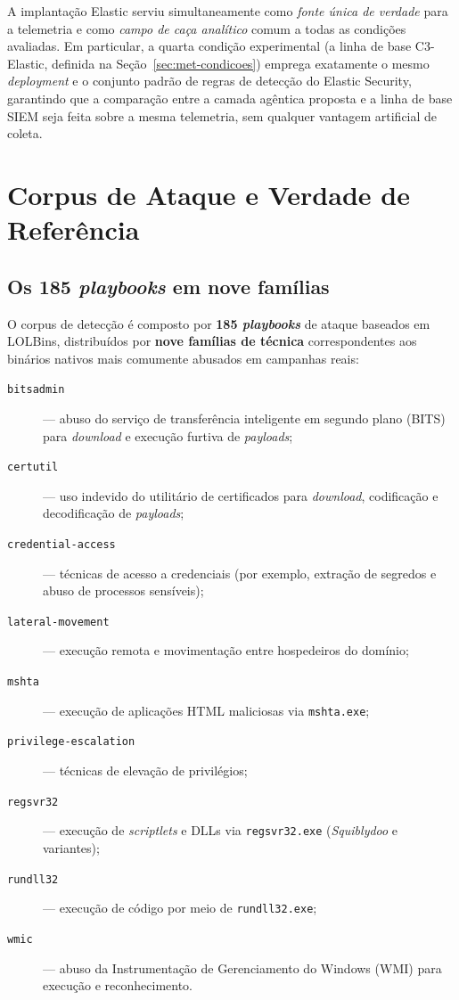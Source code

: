 A implantação Elastic serviu simultaneamente como \emph{fonte única de verdade}
para a telemetria e como \emph{campo de caça analítico} comum a todas as
condições avaliadas. Em particular, a quarta condição experimental (a linha de
base C3-Elastic, definida na Seção~\ref{sec:met-condicoes}) emprega exatamente o
mesmo \textit{deployment} e o conjunto padrão de regras de detecção do Elastic
Security, garantindo que a comparação entre a camada agêntica proposta e a linha
de base SIEM seja feita sobre a mesma telemetria, sem qualquer vantagem
artificial de coleta.

\section{Corpus de Ataque e Verdade de Referência}
\label{sec:met-corpus}

\subsection{Os 185 \textit{playbooks} em nove famílias}

O corpus de detecção é composto por \textbf{185 \textit{playbooks}} de ataque
baseados em LOLBins, distribuídos por \textbf{nove famílias de técnica}
correspondentes aos binários nativos mais comumente abusados em campanhas reais:

\begin{description}
    \item[\texttt{bitsadmin}] --- abuso do serviço de transferência inteligente
    em segundo plano (BITS) para \textit{download} e execução furtiva de
    \textit{payloads};
    \item[\texttt{certutil}] --- uso indevido do utilitário de certificados para
    \textit{download}, codificação e decodificação de \textit{payloads};
    \item[\texttt{credential-access}] --- técnicas de acesso a credenciais (por
    exemplo, extração de segredos e abuso de processos sensíveis);
    \item[\texttt{lateral-movement}] --- execução remota e movimentação entre
    hospedeiros do domínio;
    \item[\texttt{mshta}] --- execução de aplicações HTML maliciosas via
    \texttt{mshta.exe};
    \item[\texttt{privilege-escalation}] --- técnicas de elevação de
    privilégios;
    \item[\texttt{regsvr32}] --- execução de \textit{scriptlets} e DLLs via
    \texttt{regsvr32.exe} (\textit{Squiblydoo} e variantes);
    \item[\texttt{rundll32}] --- execução de código por meio de
    \texttt{rundll32.exe};
    \item[\texttt{wmic}] --- abuso da Instrumentação de Gerenciamento do Windows
    (WMI) para execução e reconhecimento.
\end{description}

